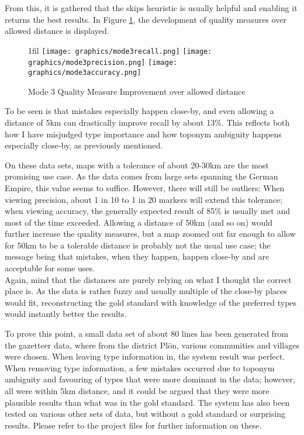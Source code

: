 \documentclass[11pt]{article}
\makeatletter
\newcommand*{\centerfloat}{
  \parindent \z@
  \leftskip \z@ \@plus 1fil \@minus \textwidth
  \rightskip\leftskip
  \parfillskip \z@skip}
\makeatother
\begin{document}
From this, it is gathered that the skips heuristic is usually helpful and enabling it returns the best results. In Figure \ref{fig:overdistance}, the development of quality measures over allowed distance is displayed.

\begin{figure}
  \centerfloat
    \texttt{[image: graphics/mode3recall.png]}
    \texttt{[image: graphics/mode3precision.png]}
    \texttt{[image: graphics/mode3accuracy.png]}
  \caption{Mode 3 Quality Measure Improvement over allowed distance}
  \label{fig:overdistance}
\end{figure}

To be seen is that mistakes especially happen close-by, and even allowing a distance of 5km can drastically improve recall by about 13\%. This reflects both how I have misjudged type importance and how toponym ambiguity happens especially close-by, as previously mentioned.

On these data sets, maps with a tolerance of about 20-30km are the most promising use case. As the data comes from large sets spanning the German Empire, this value seems to suffice. However, there will still be outliers: When viewing precision, about 1 in 10 to 1 in 20 markers will extend this tolerance; when viewing accuracy, the generally expected result of 85\% is usually met and most of the time exceeded. Allowing a distance of 50km (and so on) would further increase the quality measures, but a map zoomed out far enough to allow for 50km to be a tolerable distance is probably not the usual use case; the message being that mistakes, when they happen, happen close-by and are acceptable for some uses.\\

Again, mind that the distances are purely relying on what I thought the correct place is. As the data is rather fuzzy and usually multiple of the close-by places would fit, reconstructing the gold standard with knowledge of the preferred types would instantly better the results.

To prove this point, a small data set of about 80 lines has been generated from the gazetteer data, where from the district Plön, various communities and villages were chosen. When leaving type information in, the system result was perfect. When removing type information, a few mistakes occurred due to toponym ambiguity and favouring of types that were more dominant in the data; however, all were within 5km distance, and it could be argued that they were more plausible results than what was in the gold standard. The system has also been tested on various other sets of data, but without a gold standard or surprising results. Please refer to the project files for further information on these.\\
\end{document}
